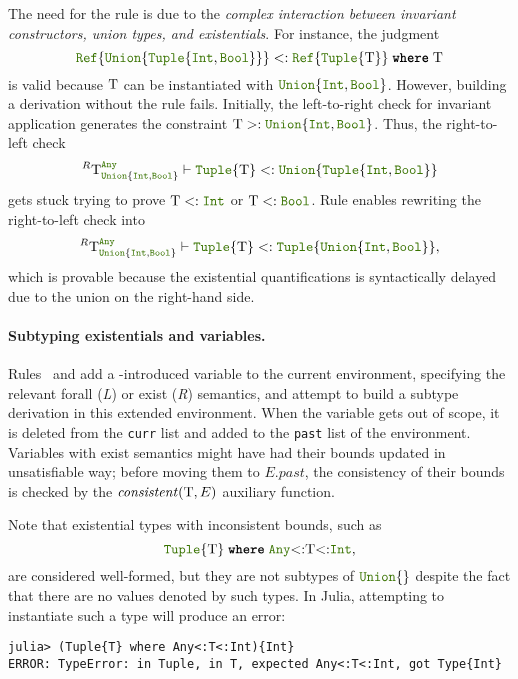 The need for the
 rule is
due to the \emph{complex interaction between invariant constructors, union
types, and existentials}.  For instance, the judgment
\[
  \reftyp{\uniontyp{\tupletyp{\inttyp, \jlname{Bool}}}} <:
  \wheret{\reftyp{\tupletyp{\T}}}{\T}
\]
is valid because \(\mathrm{T}\) can be instantiated with
$\uniontyp{\inttyp, \jlname{Bool}}$.  However, building a derivation without the
 rule fails.  Initially, the
left-to-right check for invariant application generates the constraint
\(\T >: \uniontyp{\inttyp, \jlname{Bool}}\).  Thus, the right-to-left check
\[ ^R \T_{\uniontyp{\inttyp, \jlname{Bool}}}^{\anytyp} \vdash
  \tupletyp{\T} <: \uniontyp{\tupletyp{\inttyp, \jlname{Bool}}} \]
gets stuck trying to prove \(\T<:\inttyp\) or \(\T<:\jlname{Bool}\).  Rule
 enables rewriting the
right-to-left check into 
\[ ^R \T_{\uniontyp{\inttyp, \jlname{Bool}}}^{\anytyp} \vdash
  \tupletyp{\T} <: \tupletyp{\uniontyp{\inttyp, \jlname{Bool}}}, \]
which is provable because the existential quantifications is syntactically
delayed  due to the union on the right-hand side.

\paragraph{Subtyping existentials and variables.}
Rules~ and  add a
\wheret{}{}-introduced variable to the current environment, 
specifying the relevant forall (\textit{L}) or exist (\textit{R})
semantics, and attempt to build a subtype derivation in this extended
environment.  When the variable gets out of scope, it
is deleted from the \texttt{curr} list and added to the
\texttt{past} list of the environment. 
Variables with exist semantics might have had
their bounds updated in unsatisfiable way; before moving them to \(E.past\), the
consistency of their bounds is checked by the \(\mathit{consistent}(\mathrm{T},E)\)
auxiliary function.

Note that existential types with inconsistent bounds, such as
\[
  \wheret{\tupletyp{\T}}{\anytyp{<:}\T{<:}\inttyp},
\]
are considered well-formed, but they are not subtypes of $\uniontyp{}$
despite the fact that there are no values denoted by such types.
In Julia, attempting to instantiate such a type will produce an error:
\begin{lstlisting}
julia> (Tuple{T} where Any<:T<:Int){Int}
ERROR: TypeError: in Tuple, in T, expected Any<:T<:Int, got Type{Int}  
\end{lstlisting}


